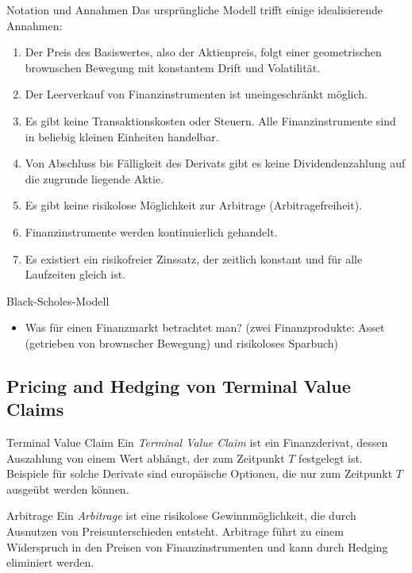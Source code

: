 \begin{bonus}{Notation und Annahmen}
    Das ursprüngliche Modell trifft einige idealisierende Annahmen:
    \begin{enumerate}
        \item Der Preis des Basiswertes, also der Aktienpreis, folgt einer geometrischen brownschen Bewegung mit konstantem Drift und Volatilität.
        \item Der Leerverkauf von Finanzinstrumenten ist uneingeschränkt möglich.
        \item Es gibt keine Transaktionskosten oder Steuern. Alle Finanzinstrumente sind in beliebig kleinen Einheiten handelbar.
        \item Von Abschluss bis Fälligkeit des Derivats gibt es keine Dividendenzahlung auf die zugrunde liegende Aktie.
        \item Es gibt keine risikolose Möglichkeit zur Arbitrage (Arbitragefreiheit).
        \item Finanzinstrumente werden kontinuierlich gehandelt.
        \item Es existiert ein risikofreier Zinssatz, der zeitlich konstant und für alle Laufzeiten gleich ist.
    \end{enumerate}
\end{bonus}

\begin{info}{Black-Scholes-Modell}
    \begin{itemize}
        \item Was für einen Finanzmarkt betrachtet man? (zwei Finanzprodukte: Asset (getrieben von brownscher Bewegung) und risikoloses Sparbuch)
    \end{itemize}
\end{info}

\subsection{Pricing and Hedging von Terminal Value Claims}

\begin{bonus}{Terminal Value Claim}
    Ein \emph{Terminal Value Claim} ist ein Finanzderivat, dessen Auszahlung von einem Wert abhängt, der zum Zeitpunkt $T$ festgelegt ist.
    Beispiele für solche Derivate sind europäische Optionen, die nur zum Zeitpunkt $T$ ausgeübt werden können.
\end{bonus}

\begin{bonus}{Arbitrage}
    Ein \emph{Arbitrage} ist eine risikolose Gewinnmöglichkeit, die durch Ausnutzen von Preisunterschieden entsteht.
    Arbitrage führt zu einem Widerspruch in den Preisen von Finanzinstrumenten und kann durch Hedging eliminiert werden.
\end{bonus}

